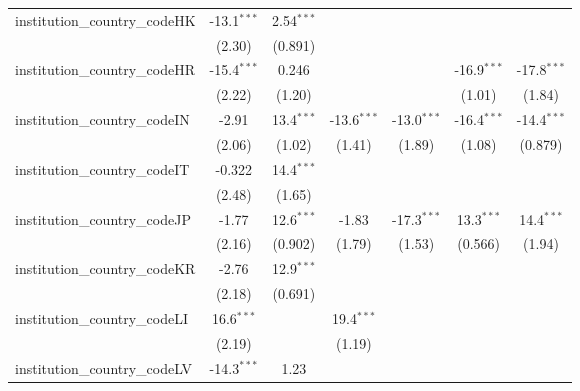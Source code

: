 \begin{tabular}{lcccccc}
   institution\_country\_codeHK          & -13.1$^{***}$ & 2.54$^{***}$  &               &               &               &   \\   
                                         & (2.30)        & (0.891)       &               &               &               &   \\   
   institution\_country\_codeHR          & -15.4$^{***}$ & 0.246         &               &               & -16.9$^{***}$ & -17.8$^{***}$\\   
                                         & (2.22)        & (1.20)        &               &               & (1.01)        & (1.84)\\   
   institution\_country\_codeIN          & -2.91         & 13.4$^{***}$  & -13.6$^{***}$ & -13.0$^{***}$ & -16.4$^{***}$ & -14.4$^{***}$\\   
                                         & (2.06)        & (1.02)        & (1.41)        & (1.89)        & (1.08)        & (0.879)\\   
   institution\_country\_codeIT          & -0.322        & 14.4$^{***}$  &               &               &               &   \\   
                                         & (2.48)        & (1.65)        &               &               &               &   \\   
   institution\_country\_codeJP          & -1.77         & 12.6$^{***}$  & -1.83         & -17.3$^{***}$ & 13.3$^{***}$  & 14.4$^{***}$\\   
                                         & (2.16)        & (0.902)       & (1.79)        & (1.53)        & (0.566)       & (1.94)\\   
   institution\_country\_codeKR          & -2.76         & 12.9$^{***}$  &               &               &               &   \\   
                                         & (2.18)        & (0.691)       &               &               &               &   \\   
   institution\_country\_codeLI          & 16.6$^{***}$  &               & 19.4$^{***}$  &               &               &   \\   
                                         & (2.19)        &               & (1.19)        &               &               &   \\   
   institution\_country\_codeLV          & -14.3$^{***}$ & 1.23          &               &               &               &   \\   

\end{tabular}
